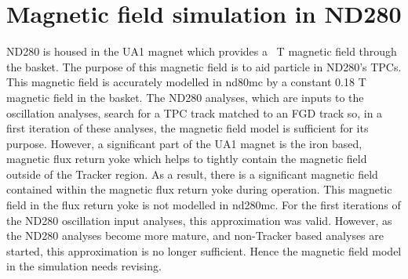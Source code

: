 \chapter{Magnetic field simulation in ND280}
\label{chap:MagneticFieldSimulation}
ND280 is housed in the  UA1 magnet which provides a ~T magnetic field through the basket.  The purpose of this magnetic field is to aid particle   in ND280's TPCs.  This magnetic field is accurately modelled in nd80mc by a constant 0.18 T magnetic field in the basket.  The ND280 analyses, which are inputs to the oscillation analyses, search for a TPC track matched to an FGD track so, in a first iteration of these analyses, the magnetic field model is sufficient for its purpose.
\newline
\newline
However, a significant part of the UA1 magnet is the iron based, magnetic flux return yoke which helps to tightly contain the magnetic field outside of the Tracker region.  As a result, there is a significant magnetic field contained within the magnetic flux return yoke during operation.  This magnetic field in the flux return yoke is not modelled in nd280mc.  For the first iterations of the ND280 oscillation input analyses, this approximation was valid.  However, as the ND280 analyses become more mature, and non-Tracker based analyses are started, this approximation is no longer sufficient.  Hence the magnetic field model in the simulation needs revising.
\newline
\newline
{}

